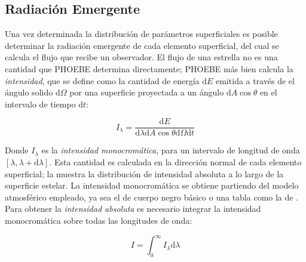 \subsection{Radiación Emergente}

Una vez determinada la distribución de parámetros superficiales es posible
determinar la radiación emergente de cada elemento superficial, del cual se
calcula el flujo que recibe un observador. El flujo de una estrella no es una
cantidad que PHOEBE determina directamente; PHOEBE más bien calcula la
\textit{intensidad}, que se define como la cantidad de energía $\mathrm{d}E$
emitida a través de el ángulo solido $\mathrm{d}\Omega$ por una superficie
proyectada a un ángulo $\mathrm{d}A \cos{\theta}$ en el intervalo de tiempo
$\mathrm{d}t$:

\begin{eqfloat}[!ht]
	\centering
	\begin{equation}
		I_{\lambda} = \frac{\textrm{d}E}{\textrm{d}\lambda \textrm{d}A \cos{\theta} \textrm{d}\Omega \textrm{d}t}
	\end{equation}
	\blankcaption
	\label{ecuacionIntensidadMonocromatica}
\end{eqfloat}

Donde $I_{\lambda}$ es la \textit{intensidad monocromática}, para un intervalo
de longitud de onda $[\lambda, \lambda + \textrm{d}\lambda]$. Esta cantidad es
calculada en la dirección normal de cada elemento superficial; la
 muestra la distribución de
intensidad absoluta a lo largo de la superficie estelar. La intensidad
monocromática se obtiene partiendo del modelo atmosférico empleado, ya sea el de
cuerpo negro básico o una tabla como la de \autocite{kurucz_atlas_1970}. Para
obtener la \textit{intensidad absoluta} es necesario integrar la intensidad
monocromática sobre todas las longitudes de onda:

\begin{eqfloat}[!ht]
	\centering
	\begin{equation}
		I = \int_{0}^{\infty}{I_{\lambda} \textrm{d}\lambda}
	\end{equation}
	\blankcaption
	\label{ecuacionIntensidadTotal}
\end{eqfloat}

